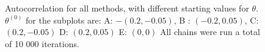\begin{figure}[ht]
      \caption{Autocorrelation for all methods, with different starting values for $\theta$. $\theta^{\left(0\right)}$ for the subplots are:   A: $-(0.2, -0.05)$, B : $(-0.2, 0.05)$, C: $(0.2, -0.05)$ D: $(0.2, 0.05)$ E: $(0,0)$ All chains were run a total of 10 000 iterations.   }
    \label{fig:autocorrelation_10k_04_06_normal}%
\end{figure}

